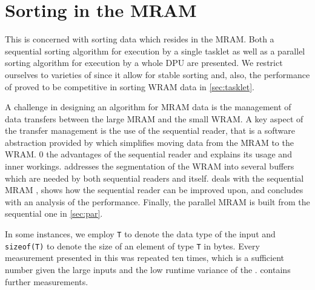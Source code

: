 \chapter[Sorting in the \texorpdfstring{\abb{MRAM}}{MRAM}]{Sorting in the \acs*{MRAM}}
\label{sec:mram}

This  is concerned with sorting data which resides in the \ac{MRAM}.
Both a sequential sorting algorithm for execution by a single tasklet as well as a parallel sorting algorithm for execution by a whole \ac{DPU} are presented.
We restrict ourselves to varieties of \MS{} since it allow for stable sorting and, also, the performance of \MS{} proved to be competitive in sorting \ac{WRAM} data in \cref{sec:tasklet}.

A challenge in designing an algorithm for \ac{MRAM} data is the management of data transfers between the large \ac{MRAM} and the small \ac{WRAM}.
A key aspect of the transfer management is the use of the sequential reader, that is a software abstraction provided by \upmem{} which simplifies moving data from the \ac{MRAM} to the \ac{WRAM}.
 0 the advantages of the sequential reader and explains its usage and inner workings.
 addresses the segmentation of the \ac{WRAM} into several buffers which are needed by both sequential readers and \MS{} itself.
 deals with the sequential \ac{MRAM} \MS{}, shows how the sequential reader can be improved upon, and concludes with an analysis of the performance.
Finally, the parallel \ac{MRAM} \MS{} is built from the sequential one in \cref{sec:par}.

In some instances, we employ \lstinline|T| to denote the data type of the input and \lstinline[keywords={}]|sizeof(T)| to denote the size of an element of type \lstinline|T| in bytes.
Every measurement presented in this  was repeated ten times, which is a sufficient number given the large inputs and the low runtime variance of the \MS*{}.
 contains further measurements.






